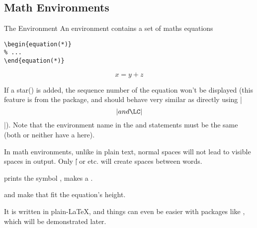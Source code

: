 \subsection{Math Environments}


\begin{frame}[fragile]{The  Environment}
	An  environment contains a set of maths equations
	\begin{command}
		\begin{verbatim}
\begin{equation(*)}
% ...
\end{equation(*)}
		\end{verbatim}
	\end{command}
	\begin{example}
		\begin{equation*}
      x = y + z
    \end{equation*}
	\end{example}
	If a star(\structure{*}) is added, the sequence number of the equation won't be displayed (this feature is from the  package, and should behave very similar as directly using \LC|\[| and \LC|\]|). Note that the environment name in the \LC{\begin} and \LC{\end} statements must be the same (both or neither have a \structure{*} here).
\end{frame}

\begin{frame}[fragile]
	
	In math environments, unlike in plain text, normal spaces will not lead to visible spaces in output. Only  \LC|\|\packagename{\textvisiblespace} or \LC{\quad,\qquad} etc. will create spaces between words. \medskip
	
	\LC{\partial} prints the symbol \structure{$\partial$},  makes a . \medskip
	
	\LC{\left(} and \LC{\right(} make  that fit the equation's height. \medskip
	
	It is written in plain-\LaTeX, and things can even be easier with packages like , which will be demonstrated later.
\end{frame}

